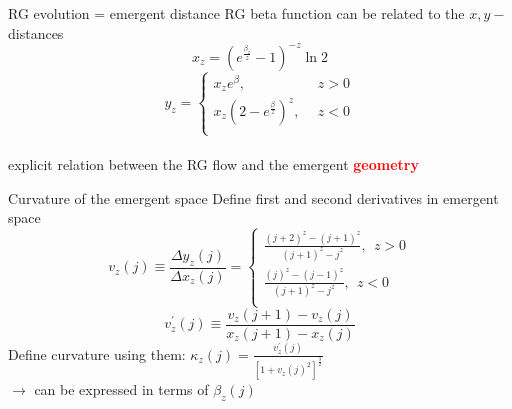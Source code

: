 \documentclass[11pt,aspectratio=169]{beamer}
\newcommand{\focus}[1]{\textcolor{red}{\bf{#1}}}
\begin{document}
\begin{frame}{RG evolution = emergent distance}
	RG beta function can be related to the \(x,y-\)distances
	\[x_z = \left( e^\frac{\beta_z}{z} - 1 \right)^{-z} \ln 2\]
	\[y_z = \begin{cases}
		x_z e^\beta,~~ &z > 0\\
		x_z \left(2 - e^\frac{\beta}{z}\right)^z,~~ &z < 0\\
	\end{cases}\]
	\\[10pt]
	explicit relation between the RG flow and the emergent \focus{geometry}
\end{frame}

\begin{frame}{Curvature of the emergent space}
	Define first and second derivatives in emergent space
	\[v_z(j) \equiv \frac{\Delta y_z(j)}{\Delta x_z(j)} =\begin{cases}
		\frac{\left(j+2\right)^z - \left(j+1\right)^z}{\left(j+1\right)^z - j^z},~ ~ z > 0\\
		\frac{\left(j\right)^z - \left(j-1\right)^z}{\left(j+1\right)^z - j^z},~ ~ z < 0\\
	\end{cases}
\]
\[
	v^\prime_z(j) \equiv \frac{v_z(j+1) - v_z(j)}{x_z(j+1) - x_z(j)}
\]
Define curvature using them: {\Large\(\kappa_{z}(j) = \frac{v^\prime_z(j)}{\left[1 + v_z(j)^2\right]^\frac{3}{2}}\)}\\[10pt]
\(\longrightarrow\) can be expressed in terms of \(\beta_z(j)\)
\end{frame}
\end{document}
